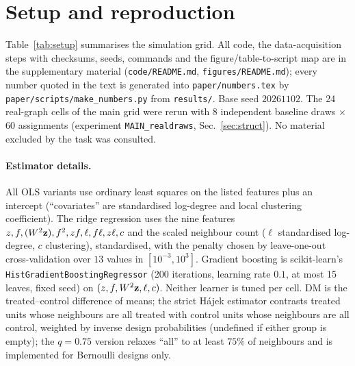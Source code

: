 \section{Setup and reproduction}
\label{app:setup}
Table~\ref{tab:setup} summarises the simulation grid. All code, the data-acquisition steps with checksums, seeds, commands and the figure/table-to-script map are in the supplementary material (\texttt{code/README.md}, \texttt{figures/README.md}); every number quoted in the text is generated into \texttt{paper/numbers.tex} by \texttt{paper/scripts/make\_numbers.py} from \texttt{results/}. Base seed $20261102$. The 24 real-graph cells of the main grid were rerun with 8 independent baseline draws $\times$ 60 assignments (experiment \texttt{MAIN\_realdraws}, Sec.~\ref{sec:struct}). No material excluded by the task was consulted.
\paragraph{Estimator details.} All OLS variants use ordinary least squares on the listed features plus an intercept (``covariates'' are standardised log-degree and local clustering coefficient). The ridge regression uses the nine features $z,f,(W^2\mathbf{z}),f^2,zf,\ell,f\ell,z\ell,c$ and the scaled neighbour count ($\ell$ standardised log-degree, $c$ clustering), standardised, with the penalty chosen by leave-one-out cross-validation over $13$ values in $[10^{-3},10^3]$. Gradient boosting is scikit-learn's \texttt{HistGradientBoostingRegressor} (200 iterations, learning rate $0.1$, at most 15 leaves, fixed seed) on $(z,f,W^2\mathbf{z},\ell,c)$. Neither learner is tuned per cell. DM is the treated--control difference of means; the strict H\'ajek estimator contrasts treated units whose neighbours are all treated with control units whose neighbours are all control, weighted by inverse design probabilities (undefined if either group is empty); the $q=0.75$ version relaxes ``all'' to at least $75\%$ of neighbours and is implemented for Bernoulli designs only.
